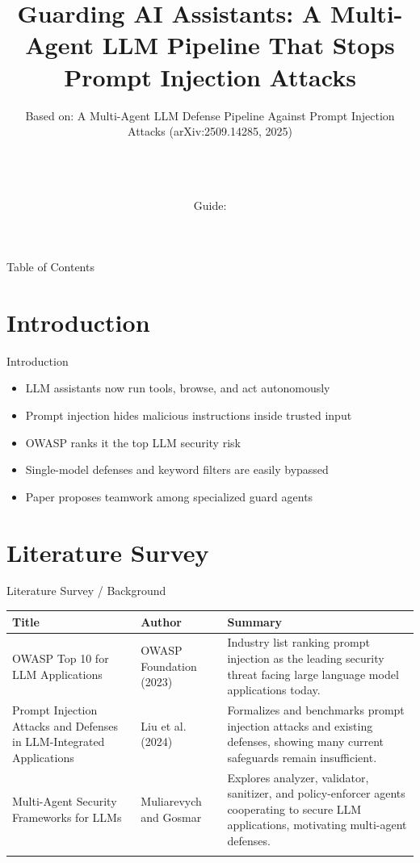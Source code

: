 \documentclass[10pt]{beamer}
\title[B.Tech Seminar]{Guarding AI Assistants: A Multi-Agent LLM Pipeline That Stops Prompt Injection Attacks}
\subtitle{Based on: A Multi-Agent LLM Defense Pipeline Against Prompt Injection Attacks (arXiv:2509.14285, 2025)}
\author[\studentname\ (\shortinst)]{\studentname \\ \small \rollno \\ \small \rollclass \\ \small Guide: \guidename}
\institute[]{\deptname \\ \collegename}
\date{\seminardate}
\begin{document}
\begin{frame}[plain]
  \titlepage
\end{frame}

\begin{frame}{Table of Contents}
  \tableofcontents
\end{frame}

\section{Introduction}
\begin{frame}{Introduction}
\begin{itemize}
  \item LLM assistants now run tools, browse, and act autonomously
  \item Prompt injection hides malicious instructions inside trusted input
  \item OWASP ranks it the top LLM security risk
  \item Single-model defenses and keyword filters are easily bypassed
  \item Paper proposes teamwork among specialized guard agents
\end{itemize}
\end{frame}

\section{Literature Survey}
\begin{frame}{Literature Survey / Background}
  \small
  \begin{tabular}{@{}p{2.7cm}p{2.3cm}p{5.6cm}@{}}
    \toprule
    \textbf{Title} & \textbf{Author} & \textbf{Summary} \\
    \midrule
    OWASP Top 10 for LLM Applications & OWASP Foundation (2023) & Industry list ranking prompt injection as the leading security threat facing large language model applications today. \\
    \addlinespace
    Prompt Injection Attacks and Defenses in LLM-Integrated Applications & Liu et al. (2024) & Formalizes and benchmarks prompt injection attacks and existing defenses, showing many current safeguards remain insufficient. \\
    \addlinespace
    Multi-Agent Security Frameworks for LLMs & Muliarevych and Gosmar & Explores analyzer, validator, sanitizer, and policy-enforcer agents cooperating to secure LLM applications, motivating multi-agent defenses. \\
    \addlinespace
    \bottomrule
  \end{tabular}
\end{frame}
\end{document}
